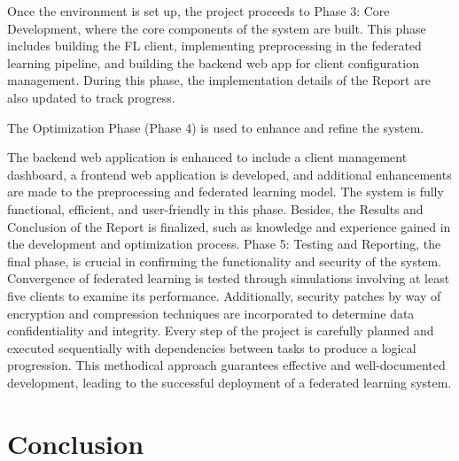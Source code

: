 Once the environment is set up, the project proceeds to Phase 3: Core Development, where the core components of the system are built. This phase includes building the FL client, implementing preprocessing in the federated learning pipeline, and building the backend web app for client configuration management. During this phase, the implementation details of the Report are also updated to track progress.

The Optimization Phase (Phase 4) is used to enhance and refine the system.

The backend web application is enhanced to include a client management dashboard, a frontend web application is developed, and additional enhancements are made to the preprocessing and federated learning model. The system is fully functional, efficient, and user-friendly in this phase. Besides, the Results and Conclusion of the Report is finalized, such as knowledge and experience gained in the development and optimization process. Phase 5: Testing and Reporting, the final phase, is crucial in confirming the functionality and security of the system. Convergence of federated learning is tested through simulations involving at least five clients to examine its performance. Additionally, security patches by way of encryption and compression techniques are incorporated to determine data confidentiality and integrity. Every step of the project is carefully planned and executed sequentially with dependencies between tasks to produce a logical progression. This methodical approach guarantees effective and well-documented development, leading to the successful deployment of a federated learning system.

\newpage

\section*{Conclusion}
